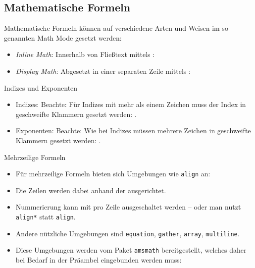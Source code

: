 \subsection{Mathematische Formeln}

\begin{frame}[fragile]{\subsecname}
    Mathematische Formeln können auf verschiedene Arten und Weisen im so genannten \alert{Math Mode}
    gesetzt werden:
    \begin{itemize}
        \item \emph{Inline Math}: Innerhalb von Fließtext mittels :
        \item \emph{Display Math}: Abgesetzt in einer separaten Zeile mittels \code{\[...\]}:
    \end{itemize}
\end{frame}

\begin{frame}[fragile]{Indizes und Exponenten}
    \begin{itemize}
        \item Indizes:
            Beachte: Für Indizes mit mehr als einem Zeichen muss der Index in geschweifte Klammern
            gesetzt werden: .
        \smallskip
        \item Exponenten:
            Beachte: Wie bei Indizes müssen mehrere Zeichen in geschweifte Klammern gesetzt werden:
            .
    \end{itemize}
\end{frame}

\begin{frame}[fragile]{Mehrzeilige Formeln}
    \begin{itemize}
        \item Für mehrzeilige Formeln bieten sich Umgebungen wie \texttt{align} an:
        \item Die Zeilen werden dabei anhand der \code{&} ausgerichtet.
        \item Nummerierung kann mit \code{\nonumber} pro Zeile ausgeschaltet werden -- oder man
            nutzt \texttt{align*} statt \texttt{align}.
        \item Andere nützliche Umgebungen sind \texttt{equation}, \texttt{gather}, \texttt{array},
            \texttt{multiline}.
        \item Diese Umgebungen werden vom Paket \texttt{amsmath} bereitgestellt, welches daher bei
            Bedarf in der Präambel eingebunden werden muss:
            \begin{center}
                \code{\usepackage{amsmath}}
            \end{center}
    \end{itemize}
\end{frame}

